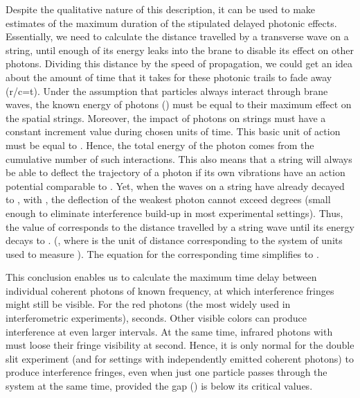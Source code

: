 \documentclass[a4paper,aps,prl,twocolumn,showpacs]{revtex4}
\begin{document}
Despite the qualitative nature of this description, it can be used
to make estimates of the maximum duration of the stipulated
delayed photonic effects. Essentially, we need to calculate the
distance \coordHE{} travelled by a transverse wave on a string, until
enough of its energy leaks into the brane to disable its effect on
other photons. Dividing this distance by the speed of propagation,
we could get an idea about the amount of time that it takes for
these photonic trails to fade away (r/c=t). Under the assumption
that particles always interact through brane waves, the known
energy of photons (\coordHE{}) must be equal to their maximum
effect on the spatial strings. Moreover, the impact of photons on
strings must have a constant increment value during chosen units
of time. This basic unit of action must be equal to \coordHE{}. Hence,
the total energy of the photon comes from the cumulative number of
such interactions. This also means that a string will always be
able to deflect the trajectory of a photon if its own vibrations
have an action potential comparable to \coordHE{}. Yet, when the waves on
a string have already decayed to \coordHE{}, with
\coordHE{}, the deflection of the weakest photon cannot
exceed \coordHE{} degrees (small enough to eliminate interference
build-up in most experimental settings). Thus, the value of \coordHE{}
corresponds to the distance travelled by a string wave until its
energy \coordHE{} decays to \coordHE{}. (\coordHE{},
where \coordHE{} is the unit of distance corresponding to the system
of units used to measure \coordHE{}). The equation for the corresponding
time simplifies to \coordHE{}.

This conclusion enables us to calculate the maximum time delay
between individual coherent photons of known frequency, at which
interference fringes might still be visible. For the red photons
(the most widely used in interferometric experiments), \coordHE{}
seconds. Other visible colors can produce interference at even
larger intervals. At the same time, infrared photons with
\coordHE{} must loose their fringe visibility at
\coordHE{} second. Hence, it is only normal for the double slit
experiment (and for settings with independently emitted coherent
photons) to produce interference fringes, even when just one
particle passes through the system at the same time, provided the gap (\coordHE{})
is below its critical values.
\end{document}
